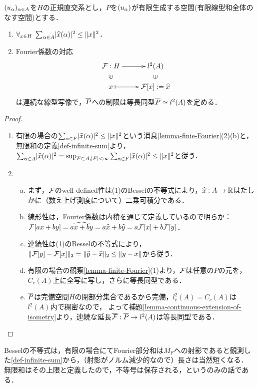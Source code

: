 \documentclass[uplatex,dvipdfmx]{jsreport}
\begin{document}
\begin{theorem}\label{thm-Bessel-and-Riesz-Fischer}
    $(u_\alpha)_{\alpha\in A}$を$H$の正規直交系とし，$P$を$(u_\alpha)$が有限生成する空間(有限線型和全体のなす空間)とする．
    \begin{enumerate}
        \item $\forall_{x\in H}\;\sum_{\alpha\in A}\lvert\widehat{x}(\alpha)\rvert^2\le\|x\|^2$．
        \item Fourier係数の対応
        \[\xymatrix@R-2pc{
            \F:H\ar[r]&l^2(A)\\
            \rotatebox[origin=c]{90}{$\in$}&\rotatebox[origin=c]{90}{$\in$}\\
            x\ar@{|->}[r]&\F[x]:=\wh{x}
        }\]
        は連続な線型写像で，$\overline{P}$への制限は等長同型$\overline{P}\simeq l^2(A)$を定める．
    \end{enumerate}
\end{theorem}
\begin{proof}\mbox{}
    \begin{enumerate}
        \item 有限の場合の$\sum_{\alpha\in F}\lvert\widehat{x}(\alpha)\rvert^2\le\|x\|^2$という消息\ref{lemma-finie-Fourier}(2)(b)と，無限和の定義\ref{def-infinite-sum}より，
        $\sum_{\alpha\in A}\lvert\widehat{x}(\alpha)\rvert^2=\sup_{F\subset A,\lvert F\rvert<\infty}\sum_{\alpha\in F}\lvert\widehat{x}(\alpha)\rvert^2\le\|x\|^2$と従う．
        \item 
        \begin{enumerate}[(a)]
            \item まず，$\mathcal{F}$のwell-defined性は(1)のBesselの不等式により，$\widehat{x}:A\to\mathbb{R}$はたしかに（数え上げ測度について）二乗可積分である．
            \item 線形性は，Fourier係数は内積を通じて定義しているので明らか：$\mathcal{F}[ax+by]=\widehat{ax+by}=a\widehat{x}+b\widehat{y}=a\mathcal{F}[x]+b\mathcal{F}[y]$．
            \item 連続性は(1)のBesselの不等式により，$\|\mathcal{F}[y]-\mathcal{F}[x]\|_2=\|\widehat{y}-\widehat{x}\|_2\le\|y-x\|$から従う．
            \item 有限の場合の観察\ref{lemma-finite-Fourier}(1)より，$\mathcal{F}$は任意の$P$の元を，$C_c(A)$上に全写に写し，さらに等長同型である．
            \item $\overline{P}$は完備空間$H$の閉部分集合であるから完備，$l^2_c(A)=C_c(A)$は$l^2(A)$内で稠密なので，
            よって補題\ref{lemma-continuous-extension-of-isometry}より，連続な延長$\overline{\mathcal{F}}:\overline{P}\to l^2(A)$は等長同型である．
        \end{enumerate}
    \end{enumerate}
\end{proof}
\begin{remarks}
    Besselの不等式は，有限の場合にてFourier部分和は$M_F$への射影であると観測した\ref{def-infinite-sum}から，（射影がノルム減少的なので）長さは当然短くなる．
    無限和はその上限と定義したので，不等号は保存される，というのみの話である．

\end{remarks}
\end{document}
